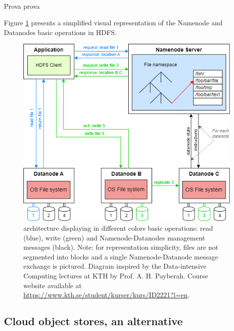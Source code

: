 \subsection{}
Prova prova

Figure \ref{fig:hdfs_schema} presents a simplified visual representation of the Namenode and Datanodes basic operations in \gls{HDFS}.

\begin{figure}[!ht]
    \begin{center}
      \includegraphics[width=\textwidth]{figures/2-background_and_related_work/hdfs_schema.png}
    \end{center}
    \caption[Hadoop Distributed File System architecture]{ architecture displaying in different colors basic operations: read (blue), write (green) and Namenode-Datanodes management messages (black). Note: for representation simplicity, files are not segmented into blocks and a single Namenode-Datanode message exchange is pictured. Diagram inspired by the Data-intensive Computing lectures at KTH by Prof. A. H. Payberah. Course website available at \url{https://www.kth.se/student/kurser/kurs/ID2221?l=en}.}
    \label{fig:hdfs_schema}
\end{figure}

\subsection{}

\subsection{Cloud object stores, an alternative}
